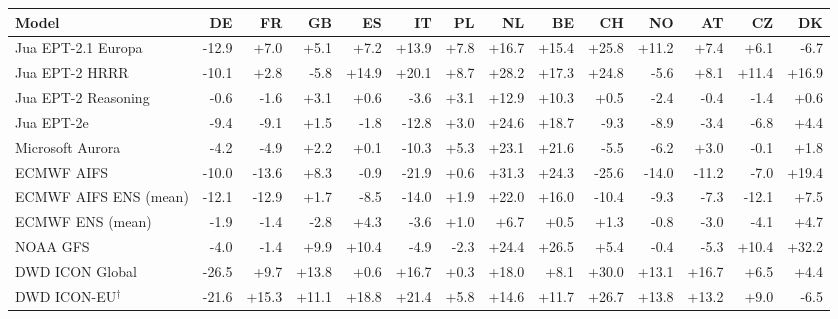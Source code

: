\begin{tabular}{lrrrrrrrrrrrrr}
\toprule
Model & DE & FR & GB & ES & IT & PL & NL & BE & CH & NO & AT & CZ & DK \\
\midrule
Jua EPT-2.1 Europa & -12.9 & +7.0 & +5.1 & +7.2 & +13.9 & +7.8 & +16.7 & +15.4 & +25.8 & +11.2 & +7.4 & +6.1 & -6.7 \\
Jua EPT-2 HRRR & -10.1 & +2.8 & -5.8 & +14.9 & +20.1 & +8.7 & +28.2 & +17.3 & +24.8 & -5.6 & +8.1 & +11.4 & +16.9 \\
Jua EPT-2 Reasoning & -0.6 & -1.6 & +3.1 & +0.6 & -3.6 & +3.1 & +12.9 & +10.3 & +0.5 & -2.4 & -0.4 & -1.4 & +0.6 \\
Jua EPT-2e & -9.4 & -9.1 & +1.5 & -1.8 & -12.8 & +3.0 & +24.6 & +18.7 & -9.3 & -8.9 & -3.4 & -6.8 & +4.4 \\
Microsoft Aurora & -4.2 & -4.9 & +2.2 & +0.1 & -10.3 & +5.3 & +23.1 & +21.6 & -5.5 & -6.2 & +3.0 & -0.1 & +1.8 \\
ECMWF AIFS & -10.0 & -13.6 & +8.3 & -0.9 & -21.9 & +0.6 & +31.3 & +24.3 & -25.6 & -14.0 & -11.2 & -7.0 & +19.4 \\
ECMWF AIFS ENS (mean) & -12.1 & -12.9 & +1.7 & -8.5 & -14.0 & +1.9 & +22.0 & +16.0 & -10.4 & -9.3 & -7.3 & -12.1 & +7.5 \\
ECMWF ENS (mean) & -1.9 & -1.4 & -2.8 & +4.3 & -3.6 & +1.0 & +6.7 & +0.5 & +1.3 & -0.8 & -3.0 & -4.1 & +4.7 \\
NOAA GFS & -4.0 & -1.4 & +9.9 & +10.4 & -4.9 & -2.3 & +24.4 & +26.5 & +5.4 & -0.4 & -5.3 & +10.4 & +32.2 \\
DWD ICON Global & -26.5 & +9.7 & +13.8 & +0.6 & +16.7 & +0.3 & +18.0 & +8.1 & +30.0 & +13.1 & +16.7 & +6.5 & +4.4 \\
DWD ICON-EU$^{\dagger}$ & -21.6 & +15.3 & +11.1 & +18.8 & +21.4 & +5.8 & +14.6 & +11.7 & +26.7 & +13.8 & +13.2 & +9.0 & -6.5 \\
\bottomrule
\end{tabular}
